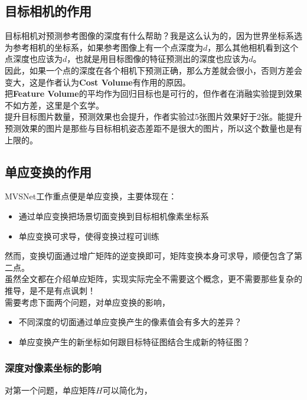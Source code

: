 \subsection{目标相机的作用}

	目标相机对预测参考图像的深度有什么帮助？我是这么认为的，因为世界坐标系选为参考相机的坐标系，如果参考图像上有一个点深度为$d$，那么其他相机看到这个点深度也应该为$d$，也就是用目标图像的特征预测出的深度也应该为$d$。\\

	因此，如果一个点的深度在各个相机下预测正确，那么方差就会很小，否则方差会变大，这是作者认为\textbf{Cost Volume}有作用的原因。\\

	把\textbf{Feature Volume}的平均作为回归目标也是可行的，但作者在消融实验提到效果不如方差，这里是个玄学。\\

	提升目标图片数量，预测效果也会提升，作者实验过5张图片效果好于2张。能提升预测效果的图片是那些与目标相机姿态差距不是很大的图片，所以这个数量也是有上限的。

\subsection{单应变换的作用}
	MVSNet工作重点便是单应变换，主要体现在：
	\begin{itemize}
		\item 通过单应变换把场景切面变换到目标相机像素坐标系
		\item 单应变换可求导，使得变换过程可训练
	\end{itemize}

	然而，变换切面通过增广矩阵的逆变换即可，矩阵变换本身可求导，顺便包含了第二点。\\

	虽然全文都在介绍单应矩阵，实现实际完全不需要这个概念，更不需要那些复杂的推导，是不是有点讽刺！\\

	需要考虑下面两个问题，对单应变换的影响，
	\begin{itemize}
		\item 不同深度的切面通过单应变换产生的像素值会有多大的差异？
		\item 单应变换产生的新坐标如何跟目标特征图结合生成新的特征图？
	\end{itemize}

	\subsubsection*{深度对像素坐标的影响}
	对第一个问题，单应矩阵$H$可以简化为，

